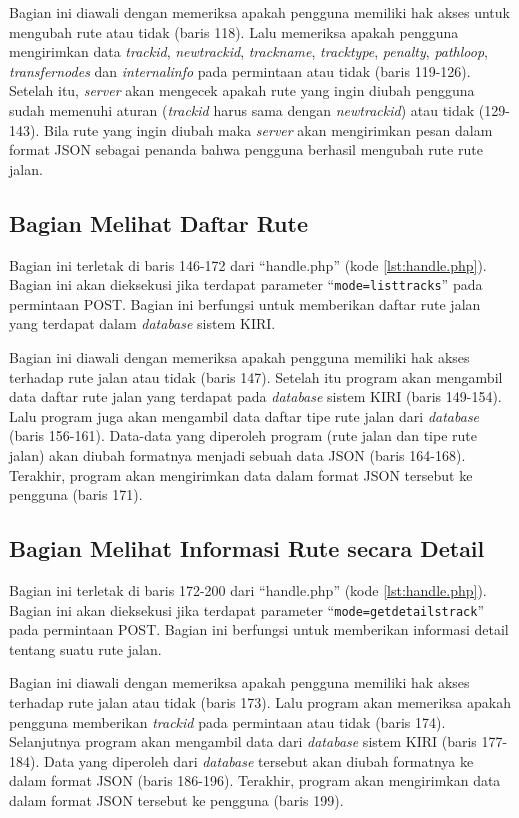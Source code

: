 Bagian ini diawali dengan memeriksa apakah pengguna memiliki hak akses untuk mengubah rute atau tidak (baris 118). Lalu memeriksa apakah pengguna mengirimkan data \textit{trackid}, \textit{newtrackid}, \textit{trackname}, \textit{tracktype}, \textit{penalty}, \textit{pathloop}, \textit{transfernodes}  dan \textit{internalinfo} pada permintaan atau tidak (baris 119-126). Setelah itu, \textit{server} akan mengecek apakah rute yang ingin diubah pengguna sudah memenuhi aturan (\textit{trackid} harus sama dengan \textit{newtrackid}) atau tidak (129-143). Bila rute yang ingin diubah maka \textit{server} akan mengirimkan pesan dalam format JSON sebagai penanda bahwa pengguna berhasil mengubah rute rute jalan.

\subsection{Bagian Melihat Daftar Rute}
\label{sec:melihatdaftarrute}
Bagian ini terletak di baris 146-172 dari ``handle.php'' (kode \ref{lst:handle.php}). Bagian ini akan dieksekusi jika terdapat parameter ``\texttt{mode=listtracks}'' pada permintaan POST. Bagian ini berfungsi untuk memberikan daftar rute jalan yang terdapat dalam \textit{database} sistem KIRI.

Bagian ini diawali dengan memeriksa apakah pengguna memiliki hak akses terhadap rute jalan atau tidak (baris 147). Setelah itu program akan mengambil data daftar rute jalan yang terdapat pada \textit{database} sistem KIRI (baris 149-154). Lalu program juga akan mengambil data daftar tipe rute jalan dari \textit{database} (baris 156-161). Data-data yang diperoleh program (rute jalan dan tipe rute jalan) akan diubah formatnya menjadi sebuah data JSON (baris 164-168). Terakhir, program akan mengirimkan data dalam format JSON tersebut ke pengguna (baris 171).

\subsection{Bagian Melihat Informasi Rute secara Detail}
\label{sec:melihatdaftarrutedetail}
Bagian ini terletak di baris 172-200 dari ``handle.php'' (kode \ref{lst:handle.php}). Bagian ini akan dieksekusi jika terdapat parameter ``\texttt{mode=getdetailstrack}'' pada permintaan POST. Bagian ini berfungsi untuk memberikan informasi detail tentang suatu rute jalan.

Bagian ini diawali dengan memeriksa apakah pengguna memiliki hak akses terhadap rute jalan atau tidak (baris 173). Lalu program akan memeriksa apakah pengguna memberikan \textit{trackid} pada permintaan atau tidak (baris 174). Selanjutnya program akan mengambil data dari \textit{database} sistem KIRI (baris 177-184). Data yang diperoleh dari \textit{database} tersebut akan diubah formatnya ke dalam format JSON (baris 186-196). Terakhir, program akan mengirimkan data dalam format JSON tersebut ke pengguna (baris 199).

